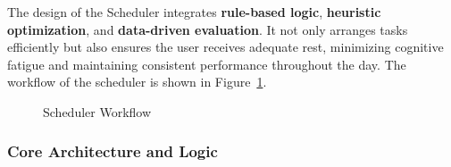 \documentclass[12pt, a4paper]{article}
\begin{document}
        The design of the Scheduler integrates \textbf{rule-based logic}, \textbf{heuristic optimization}, and \textbf{data-driven evaluation}. It not only arranges tasks efficiently but also ensures the user receives adequate rest, minimizing cognitive fatigue and maintaining consistent performance throughout the day. The workflow of the scheduler is shown in Figure~\ref{scheduler}. 

        \begin{figure}[H]
            \centering
            
            \caption{Scheduler Workflow}
            \label{scheduler}
        \end{figure}

        \subsubsection{Core Architecture and Logic}
\end{document}

